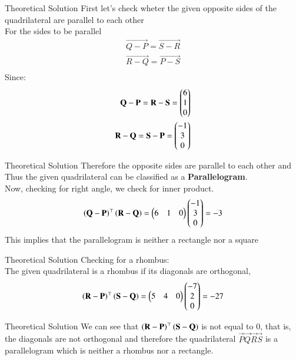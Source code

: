 \documentclass{beamer}
\begin{document}
\begin{frame}{Theoretical Solution}
First let's check wheter the given opposite sides of the quadrilateral are parallel to each other \\
For the sides to be parallel 
\begin{align}
    \vec{Q-P}=\vec{S-R}\\
    \vec{R-Q}=\vec{P-S}\\
\end{align}
Since:
\begin{align}
    \mathbf{Q-P}=\mathbf{R-S}=\begin{pmatrix}6\\1\\0\end{pmatrix}\\
    \mathbf{R-Q}=\mathbf{S-P}=\begin{pmatrix}-1\\3\\0\end{pmatrix}
\end{align}

\end{frame}


\begin{frame}{Theoretical Solution}
Therefore the opposite sides are parallel to each other and Thus the given quadrilateral can be classified as a \textbf{Parallelogram}.\\Now, checking for right angle, we check for inner product.
\begin{align}
 \left(\mathbf{Q}- \mathbf{P}\right)^{\top} \left(\mathbf{R}- \mathbf{Q}\right)=\begin{pmatrix}6 & 1&0\end{pmatrix}\begin{pmatrix}-1 \\3\\0\end{pmatrix}=-3
\end{align}
This implies that the parallelogram is neither a rectangle nor a square \\

\end{frame}
\begin{frame}{Theoretical Solution}
Checking for a rhombus:\\
The given quadrilateral is a rhombus if its diagonals are orthogonal,
\begin{align}
\left(\mathbf{R}- \mathbf{P}\right)^{\top} \left(\mathbf{S}- \mathbf{Q}\right)=\begin{pmatrix}5 & 4&0\end{pmatrix}\begin{pmatrix}-7\\ 2\\0\end{pmatrix}=-27
\end{align}
\end{frame}
\begin{frame}{Theoretical Solution}
We can see that $\left(\mathbf{R}- \mathbf{P}\right)^{\top} \left(\mathbf{S}- \mathbf{Q}\right)$ is not equal to $0$, that is, the diagonals are not orthogonal and therefore the quadrilateral $\vec{P}\vec{Q}\vec{R}\vec{S}$ is a parallelogram which is neither a rhombus nor a rectangle.\\
\end{frame}
\end{document}
